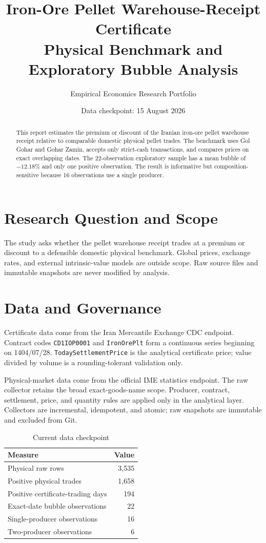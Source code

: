 \documentclass[11pt,a4paper]{article}
\title{\textbf{Iron-Ore Pellet Warehouse-Receipt Certificate}\\Physical Benchmark and Exploratory Bubble Analysis}
\author{Empirical Economics Research Portfolio}
\date{Data checkpoint: 15 August 2026}
\newcommand{\pct}{\%}
\begin{document}
\maketitle
\begin{abstract}
This report estimates the premium or discount of the Iranian iron-ore pellet warehouse receipt
relative to comparable domestic physical pellet trades. The benchmark uses Gol Gohar and Gohar
Zamin, accepts only strict-cash transactions, and compares prices on exact overlapping dates.
The 22-observation exploratory sample has a mean bubble of $-12.18\pct$ and only one positive
observation. The result is informative but composition-sensitive because 16 observations use a
single producer.
\end{abstract}
\tableofcontents
\newpage

\section{Research Question and Scope}
The study asks whether the pellet warehouse receipt trades at a premium or discount to a
defensible domestic physical benchmark. Global prices, exchange rates, and external
intrinsic-value models are outside scope. Raw source files and immutable snapshots are never
modified by analysis.

\section{Data and Governance}
Certificate data come from the Iran Mercantile Exchange CDC endpoint. Contract codes
\texttt{CD1IOP0001} and \texttt{IronOrePlt} form a continuous series beginning on 1404/07/28.
\texttt{TodaySettlementPrice} is the analytical certificate price; value divided by volume is a
rounding-tolerant validation only.

Physical-market data come from the official IME statistics endpoint. The raw collector retains
the broad exact-goods-name scope. Producer, contract, settlement, price, and quantity rules are
applied only in the analytical layer. Collectors are incremental, idempotent, and atomic; raw
snapshots are immutable and excluded from Git.

\begin{table}[H]
\centering
\caption{Current data checkpoint}
\begin{tabular}{lr}
\toprule
Measure & Value \\
\midrule
Physical raw rows & 3,535 \\
Positive physical trades & 1,658 \\
Positive certificate-trading days & 194 \\
Exact-date bubble observations & 22 \\
Single-producer observations & 16 \\
Two-producer observations & 6 \\
\bottomrule
\end{tabular}
\end{table}
\end{document}
